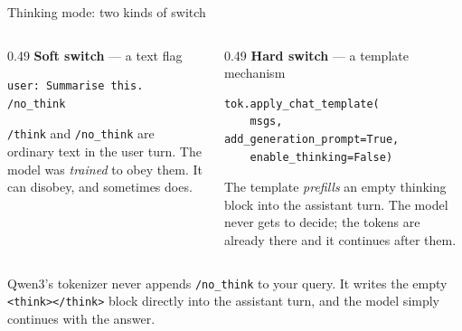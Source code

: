 \documentclass[aspectratio=169,10pt]{beamer}
\begin{document}
\iffalse
\begin{frame}[fragile]{Thinking mode: two kinds of switch}
  \begin{columns}[T]
    \begin{column}{0.49\textwidth}
      \textbf{Soft switch} --- a text flag
\begin{lstlisting}
user: Summarise this. /no_think
\end{lstlisting}
      \small
      \texttt{/think} and \texttt{/no\_think} are ordinary text in the user
      turn. The model was \emph{trained} to obey them. It can disobey, and
      sometimes does.
    \end{column}
    \begin{column}{0.49\textwidth}
      \textbf{Hard switch} --- a template mechanism
\begin{lstlisting}
tok.apply_chat_template(
    msgs, add_generation_prompt=True,
    enable_thinking=False)
\end{lstlisting}
      \small
      The template \emph{prefills} an empty thinking block into the assistant
      turn. The model never gets to decide; the tokens are already there and
      it continues after them.
    \end{column}
  \end{columns}
  \vspace{0.6em}
  \raggedright
  Qwen3's tokenizer never appends \texttt{/no\_think} to your query. It writes
  the empty \texttt{\textless think\textgreater\textless/think\textgreater}
  block directly into the assistant turn, and the model simply continues with
  the answer.
\end{frame}
\end{document}
